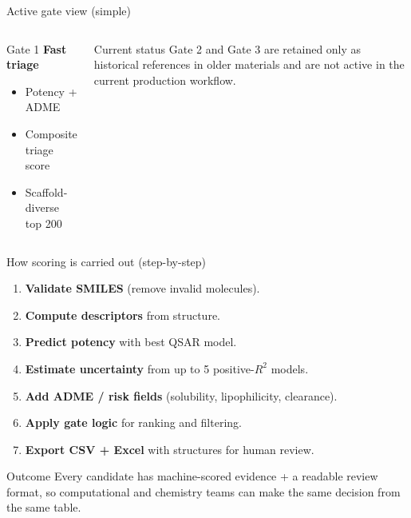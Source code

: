 \documentclass[aspectratio=169,10pt]{beamer}
\begin{document}
\begin{frame}{Active gate view (simple)}
  \begin{columns}[T]
      \begin{block}{Gate 1}
        \textbf{Fast triage}
        \begin{itemize}
          \item Potency + ADME
          \item Composite triage score
          \item Scaffold-diverse top 200
        \end{itemize}
      \end{block}
      \begin{alertblock}{Current status}
        Gate 2 and Gate 3 are retained only as historical references in older
        materials and are not active in the current production workflow.
      \end{alertblock}
  \end{columns}
\end{frame}

\begin{frame}{How scoring is carried out (step-by-step)}
  \small
  \begin{enumerate}
    \item \textbf{Validate SMILES} (remove invalid molecules).
    \item \textbf{Compute descriptors} from structure.
    \item \textbf{Predict potency} with best QSAR model.
    \item \textbf{Estimate uncertainty} from up to 5 positive-\(R^2\) models.
    \item \textbf{Add ADME / risk fields} (solubility, lipophilicity, clearance).
    \item \textbf{Apply gate logic} for ranking and filtering.
    \item \textbf{Export CSV + Excel} with structures for human review.
  \end{enumerate}

  \vspace{3pt}
  \begin{block}{Outcome}
    Every candidate has machine-scored evidence + a readable review format,
    so computational and chemistry teams can make the same decision from the
    same table.
  \end{block}
\end{frame}
\end{document}
